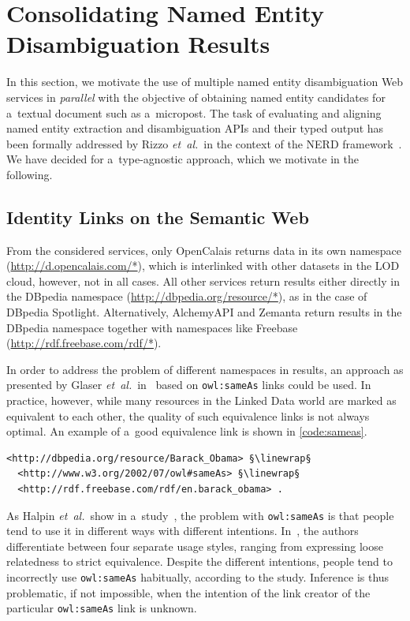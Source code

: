 \section{Consolidating Named Entity Disambiguation Results}
\label{sec:consolidate}

In this section, we motivate the use of multiple
named entity disambiguation Web services in \emph{parallel}
with the objective of obtaining named entity candidates
for a~textual document such as a~micropost.
The task of evaluating and aligning named entity extraction and
disambiguation APIs and their typed output
has been formally addressed by Rizzo \emph{et~al.}\ in
the context of the NERD
framework~\cite{rizzo2011nerd,rizzo2012nerd}.
We have decided for a~type-agnostic approach,
which we motivate in the following.

\subsection{Identity Links on the Semantic Web}
\label{sec:sameasorg}

From the considered services, only OpenCalais returns data in its
own namespace (\url{http://d.opencalais.com/*}), which is
interlinked with other datasets in the LOD cloud,
however, not in all cases.
All other services return results either directly
in the DBpedia namespace (\url{http://dbpedia.org/resource/*}),
as in the case of DBpedia Spotlight.
Alternatively, AlchemyAPI and Zemanta return results
in the DBpedia namespace together with
namespaces like Freebase
(\url{http://rdf.freebase.com/rdf/*}).

In order to address the problem of different namespaces in results,
an approach as presented by Glaser \emph{et~al.}\
in~\cite{glaser2009sameas} based on \texttt{owl:sameAs} links
could be used.
In practice, however, while many resources in the Linked Data
world are marked as equivalent to each other,
the quality of such equivalence links is not always optimal.
An example of a~good equivalence link is shown in \autoref{code:sameas}.

\begin{lstlisting}[caption={Example of a~good equivalence link},
  label={code:sameas},
  escapechar=§]
<http://dbpedia.org/resource/Barack_Obama> §\linewrap§
  <http://www.w3.org/2002/07/owl#sameAs> §\linewrap§
  <http://rdf.freebase.com/rdf/en.barack_obama> .
\end{lstlisting}

\noindent As Halpin \emph{et~al.}\ show
in a~study~\cite{halpin2010owlsameas}, the problem
with \texttt{owl:sameAs} is that people tend to use it
in different ways with different intentions.
In~\cite{halpin2010owlsameas},
the authors differentiate between four separate usage styles,
ranging from expressing loose relatedness
to strict equivalence.
Despite the different intentions, people tend to incorrectly use
\texttt{owl:sameAs} habitually, according to the study.
Inference is thus problematic, if not impossible,
when the intention of the link creator of the particular
\texttt{owl:sameAs} link is unknown.

